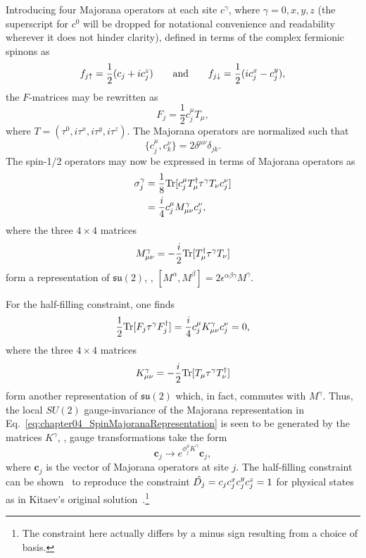 Introducing four Majorana operators at each site $c^{\gamma}$, where $\gamma = 0,x,y,z$ (the superscript for $c^0$ will be dropped for notational convenience and readability wherever it does not hinder clarity), defined in terms of the complex fermionic spinons as
%
\begin{equation}
	f_{j\uparrow} = \frac{1}{2} (c_j + ic^z_j) \qquad {\rm and } \qquad f_{j\downarrow} = \frac{1}{2} (ic^x_j - c^y_j),
\end{equation}
%
the $F$-matrices may be rewritten as
%
\begin{equation}
	F_j = \frac{1}{2} c_j^{\mu} T_{\mu},
\end{equation}
%
where $T = (\tau^0, i\tau^x, i\tau^y, i\tau^z)$.
The Majorana operators are normalized such that
%
\begin{equation}
\{c_j^{\mu}, c_k^{\nu}\} = 2\delta^{\mu\nu}\delta_{jk}.
\end{equation}
%
The spin-1/2 operators may now be expressed in terms of Majorana operators as
%
\begin{align}
	\sigma^{\gamma}_j &= \frac{1}{8} \text{Tr}{[c^{\mu}_j T\ensuremath{^{\dagger}}_{\mu} \tau^{\gamma} T_{\nu} c^{\nu}_j]} \nonumber\\
					  &= \frac{i}{4} c^{\mu}_j M^{\gamma}_{\mu\nu} c^{\nu}_j,
	\label{eq:chapter04_SpinMajoranaRepresentation}
\end{align}
%
where the three $4\times 4$ matrices
%
\begin{equation}
	M^{\gamma}_{\mu\nu} = -\frac{i}{2} \text{Tr}{[T\ensuremath{^{\dagger}}_{\mu} \tau^{\gamma} T_{\nu}]}
\end{equation}
%
form a representation of $\mathfrak{su}(2)$, \ie, $[M^{\alpha}, M^{\beta}] = 2\epsilon^{\alpha\beta\gamma} M^{\gamma}$.

For the half-filling constraint, one finds
%
\begin{equation}
	\frac{1}{2} \text{Tr}{[F_j \tau^{\gamma} F\ensuremath{^{\dagger}}_{j}]} = \frac{i}{4} c^{\mu}_j K^{\gamma}_{\mu\nu} c^{\nu}_j = 0,
	\label{eq:chapter04_HalfFillingConstraintMajorana}
\end{equation}
%
where the three $4\times 4$ matrices
%
\begin{equation}
	K^{\gamma}_{\mu\nu} = -\frac{i}{2} \text{Tr}{[T_{\mu} \tau^{\gamma} T\ensuremath{^{\dagger}}_{\nu}]}
\end{equation}
%
form another representation of $\mathfrak{su}(2)$ which, in fact, commutes with $M^{\gamma}$.
Thus, the local $SU(2)$ gauge-invariance of the Majorana representation in Eq.~\eqref{eq:chapter04_SpinMajoranaRepresentation} is seen to be generated by the matrices $K^{\gamma}$, \ie, gauge transformations take the form
%
\begin{equation}
	\bm{c}_j \rightarrow e^{\phi^{\mu}_j K^{\gamma}} \bm{c}_j,
\end{equation}
%
where $\bm{c}_j$ is the vector of Majorana operators at site $j$.
The half-filling constraint can be shown~\cite{SeifertPRBFeb2018} to reproduce the constraint $\hat{D_j} = c_j c^x_j c^y_j c^z_j = 1$ for physical states as in Kitaev's original solution~\cite{KitaevAoP2006}.\footnote{The constraint here actually differs by a minus sign resulting from a choice of basis.}

